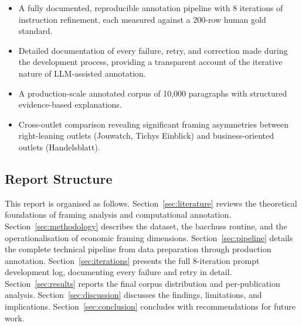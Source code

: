 \begin{itemize}
    \item A fully documented, reproducible annotation pipeline with 8 iterations of instruction refinement, each measured against a 200-row human gold standard.
    \item Detailed documentation of every failure, retry, and correction made during the development process, providing a transparent account of the iterative nature of LLM-assisted annotation.
    \item A production-scale annotated corpus of 10,000 paragraphs with structured evidence-based explanations.
    \item Cross-outlet comparison revealing significant framing asymmetries between right-leaning outlets (Jouwatch, Tichys Einblick) and business-oriented outlets (Handelsblatt).
\end{itemize}

\subsection{Report Structure}

This report is organised as follows. Section~\ref{sec:literature} reviews the theoretical foundations of framing analysis and computational annotation. Section~\ref{sec:methodology} describes the dataset, the bacchuss routine, and the operationalisation of economic framing dimensions. Section~\ref{sec:pipeline} details the complete technical pipeline from data preparation through production annotation. Section~\ref{sec:iterations} presents the full 8-iteration prompt development log, documenting every failure and retry in detail. Section~\ref{sec:results} reports the final corpus distribution and per-publication analysis. Section~\ref{sec:discussion} discusses the findings, limitations, and implications. Section~\ref{sec:conclusion} concludes with recommendations for future work.

\newpage
